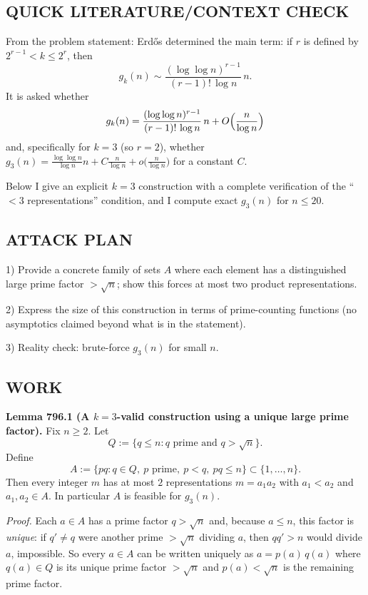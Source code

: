 \subsection*{QUICK LITERATURE/CONTEXT CHECK}
From the problem statement: Erd\H{o}s determined the main term: if $r$ is defined by $2^{r-1}<k\le 2^r$, then
\[
 g_k(n) \sim \frac{(\log\log n)^{r-1}}{(r-1)!\,\log n}\,n.
\]
It is asked whether
\[g_k(n)=\frac{(\log\log n)^{r-1}}{(r-1)!\,\log n}\,n + O\Bigl(\frac{n}{\log n}\Bigr)
\]
and, specifically for $k=3$ (so $r=2$), whether
$g_3(n)=\frac{\log\log n}{\log n}n + C\frac{n}{\log n}+o\bigl(\frac{n}{\log n}\bigr)$
for a constant $C$.

Below I give an explicit $k=3$ construction with a complete verification of the ``$<3$ representations'' condition, and I compute exact $g_3(n)$ for $n\le 20$.

\subsection*{ATTACK PLAN}
1) Provide a concrete family of sets $A$ where each element has a distinguished large prime factor $>\sqrt n$; show this forces at most two product representations.

2) Express the size of this construction in terms of prime-counting functions (no asymptotics claimed beyond what is in the statement).

3) Reality check: brute-force $g_3(n)$ for small $n$.

\subsection*{WORK}
\textbf{Lemma 796.1 (A $k=3$-valid construction using a unique large prime factor).}
Fix $n\ge 2$. Let
\[
Q:=\{q\le n: q\text{ prime and }q>\sqrt n\}.
\]
Define
\[
A:=\{pq: q\in Q,\ p\text{ prime},\ p<q,\ pq\le n\} \subset\{1,\dots,n\}.
\]
Then every integer $m$ has at most $2$ representations $m=a_1a_2$ with $a_1<a_2$ and $a_1,a_2\in A$. In particular $A$ is feasible for $g_3(n)$.

\emph{Proof.}
Each $a\in A$ has a prime factor $q>\sqrt n$ and, because $a\le n$, this factor is \emph{unique}: if $q'\ne q$ were another prime $>\sqrt n$ dividing $a$, then $qq'>n$ would divide $a$, impossible.
So every $a\in A$ can be written uniquely as $a=p(a)\,q(a)$ where $q(a)\in Q$ is its unique prime factor $>\sqrt n$ and $p(a)<\sqrt n$ is the remaining prime factor.

